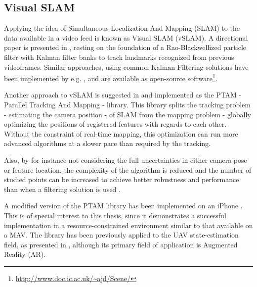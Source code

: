     \subsection{Visual SLAM}
    Applying the idea of Simultaneous Localization And Mapping (SLAM)
    to the data available in a video feed is known as Visual SLAM (vSLAM).
    A directional paper is presented in \citep{Karlsson05thevslam}, resting on the
    foundation of a Rao-Blackwellized particle filter with Kalman filter banks
    to track landmarks recognized from previous videoframes.
    Similar approaches, using common Kalman Filtering solutions have been implemented by e.g. \citep{DBLP:conf/iccv/Davison03,Eade:2006:SMS:1153170.1153506},
    and are available as open-source software\footnote{\url{http://www.doc.ic.ac.uk/~ajd/Scene/}}.

    Another approach to vSLAM is suggested in \citep{klein07parallel} and
    implemented as the PTAM - Parallel Tracking And Mapping - library.
    This library splits the tracking problem - estimating the camera position -
    of SLAM from the mapping problem - globally optimizing the positions of
    registered features with regards to each other.
    Without the constraint of real-time mapping, this optimization can run
    more advanced algorithms at a slower pace than required by the tracking.

    Also, by for instance not considering the full uncertainties in either camera pose or feature location,
    the complexity of the algorithm is reduced and the number of studied points
    can be increased to achieve better robustness and
    performance than when a filtering solution is used \citep{DBLP:conf/icra/StrasdatMD10}.

    A modified version of the PTAM library has been implemented on an iPhone \citep{klein09cameraphone}.
    This is of special interest to this thesis, since it demonstrates
    a successful implementation in a resource-constrained environment similar to that available on a MAV.
    The library has been previously applied to the UAV state-estimation field, as presented in \citep{weiss11monocular},
    although its primary field of application is Augmented Reality (AR).

